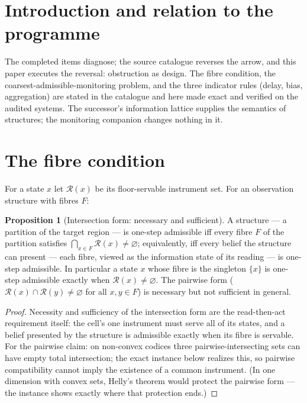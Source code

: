 \documentclass[10pt,twocolumn]{article}
\theoremstyle{definition}
\newtheorem{proposition}{Proposition}
\begin{document}
\section{Introduction and relation to the programme}

The completed items diagnose; the source catalogue reverses the arrow, and
this paper executes the reversal: obstruction as design. The fibre
condition, the coarsest-admissible-monitoring problem, and the three
indicator rules (delay, bias, aggregation) are stated in the catalogue and
here made exact and verified on the audited systems. The successor's
information lattice supplies the semantics of structures; the monitoring
companion changes nothing in it.

\section{The fibre condition}

For a state $x$ let $\mathcal R(x)$ be its floor-servable instrument set.
For an observation structure with fibres $F$:

\begin{proposition}[Intersection form: necessary and sufficient]
\label{prop:fibre}
A structure --- a partition of the target region --- is one-step
admissible iff every fibre $F$ of the partition satisfies
$\bigcap_{x\in F}\mathcal R(x)\neq\varnothing$; equivalently, iff every
belief the structure can present --- each fibre, viewed as the information
state of its reading --- is one-step admissible. In particular a state
$x$ whose fibre is the singleton $\{x\}$ is one-step admissible exactly
when $\mathcal R(x)\neq\varnothing$. The pairwise form
($\mathcal R(x)\cap\mathcal R(y)\neq\varnothing$ for all $x,y\in F$) is
necessary but not sufficient in general.
\end{proposition}
\begin{proof}
Necessity and sufficiency of the intersection form are the read-then-act
requirement itself: the cell's one instrument must serve all of its states,
and a belief presented by the structure is admissible exactly when its
fibre is servable. For the pairwise claim: on non-convex codices three
pairwise-intersecting sets can have empty total intersection; the exact
instance below realizes this, so pairwise compatibility cannot imply the
existence of a common instrument. (In one dimension with convex sets,
Helly's theorem would protect the pairwise form --- the instance shows
exactly where that protection ends.)
\end{proof}
\end{document}
